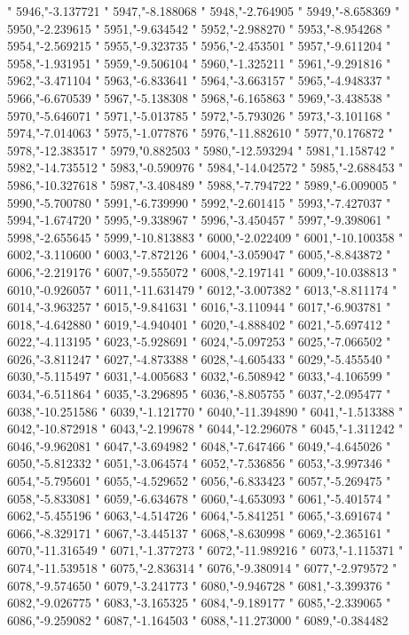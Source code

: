 "
5946,"-3.137721
"
5947,"-8.188068
"
5948,"-2.764905
"
5949,"-8.658369
"
5950,"-2.239615
"
5951,"-9.634542
"
5952,"-2.988270
"
5953,"-8.954268
"
5954,"-2.569215
"
5955,"-9.323735
"
5956,"-2.453501
"
5957,"-9.611204
"
5958,"-1.931951
"
5959,"-9.506104
"
5960,"-1.325211
"
5961,"-9.291816
"
5962,"-3.471104
"
5963,"-6.833641
"
5964,"-3.663157
"
5965,"-4.948337
"
5966,"-6.670539
"
5967,"-5.138308
"
5968,"-6.165863
"
5969,"-3.438538
"
5970,"-5.646071
"
5971,"-5.013785
"
5972,"-5.793026
"
5973,"-3.101168
"
5974,"-7.014063
"
5975,"-1.077876
"
5976,"-11.882610
"
5977,"0.176872
"
5978,"-12.383517
"
5979,"0.882503
"
5980,"-12.593294
"
5981,"1.158742
"
5982,"-14.735512
"
5983,"-0.590976
"
5984,"-14.042572
"
5985,"-2.688453
"
5986,"-10.327618
"
5987,"-3.408489
"
5988,"-7.794722
"
5989,"-6.009005
"
5990,"-5.700780
"
5991,"-6.739990
"
5992,"-2.601415
"
5993,"-7.427037
"
5994,"-1.674720
"
5995,"-9.338967
"
5996,"-3.450457
"
5997,"-9.398061
"
5998,"-2.655645
"
5999,"-10.813883
"
6000,"-2.022409
"
6001,"-10.100358
"
6002,"-3.110600
"
6003,"-7.872126
"
6004,"-3.059047
"
6005,"-8.843872
"
6006,"-2.219176
"
6007,"-9.555072
"
6008,"-2.197141
"
6009,"-10.038813
"
6010,"-0.926057
"
6011,"-11.631479
"
6012,"-3.007382
"
6013,"-8.811174
"
6014,"-3.963257
"
6015,"-9.841631
"
6016,"-3.110944
"
6017,"-6.903781
"
6018,"-4.642880
"
6019,"-4.940401
"
6020,"-4.888402
"
6021,"-5.697412
"
6022,"-4.113195
"
6023,"-5.928691
"
6024,"-5.097253
"
6025,"-7.066502
"
6026,"-3.811247
"
6027,"-4.873388
"
6028,"-4.605433
"
6029,"-5.455540
"
6030,"-5.115497
"
6031,"-4.005683
"
6032,"-6.508942
"
6033,"-4.106599
"
6034,"-6.511864
"
6035,"-3.296895
"
6036,"-8.805755
"
6037,"-2.095477
"
6038,"-10.251586
"
6039,"-1.121770
"
6040,"-11.394890
"
6041,"-1.513388
"
6042,"-10.872918
"
6043,"-2.199678
"
6044,"-12.296078
"
6045,"-1.311242
"
6046,"-9.962081
"
6047,"-3.694982
"
6048,"-7.647466
"
6049,"-4.645026
"
6050,"-5.812332
"
6051,"-3.064574
"
6052,"-7.536856
"
6053,"-3.997346
"
6054,"-5.795601
"
6055,"-4.529652
"
6056,"-6.833423
"
6057,"-5.269475
"
6058,"-5.833081
"
6059,"-6.634678
"
6060,"-4.653093
"
6061,"-5.401574
"
6062,"-5.455196
"
6063,"-4.514726
"
6064,"-5.841251
"
6065,"-3.691674
"
6066,"-8.329171
"
6067,"-3.445137
"
6068,"-8.630998
"
6069,"-2.365161
"
6070,"-11.316549
"
6071,"-1.377273
"
6072,"-11.989216
"
6073,"-1.115371
"
6074,"-11.539518
"
6075,"-2.836314
"
6076,"-9.380914
"
6077,"-2.979572
"
6078,"-9.574650
"
6079,"-3.241773
"
6080,"-9.946728
"
6081,"-3.399376
"
6082,"-9.026775
"
6083,"-3.165325
"
6084,"-9.189177
"
6085,"-2.339065
"
6086,"-9.259082
"
6087,"-1.164503
"
6088,"-11.273000
"
6089,"-0.384482
